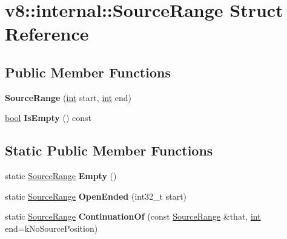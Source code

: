 \hypertarget{structv8_1_1internal_1_1SourceRange}{}\section{v8\+:\+:internal\+:\+:Source\+Range Struct Reference}
\label{structv8_1_1internal_1_1SourceRange}
\subsection*{Public Member Functions}
\begin{DoxyCompactItemize}
\item 
\mbox{\label{structv8_1_1internal_1_1SourceRange_ac4973c89147d09dda9dc633476d47c28}} 
{\bfseries Source\+Range} (\mbox{\hyperlink{classint}{int}} start, \mbox{\hyperlink{classint}{int}} end)
\item 
\mbox{\label{structv8_1_1internal_1_1SourceRange_a76ff9fd943d1a89b26a94c11bc7c53c8}} 
\mbox{\hyperlink{classbool}{bool}} {\bfseries Is\+Empty} () const
\end{DoxyCompactItemize}
\subsection*{Static Public Member Functions}
\begin{DoxyCompactItemize}
\item 
\mbox{\label{structv8_1_1internal_1_1SourceRange_a891931b7ce8fdc343f24310144dc460d}} 
static \mbox{\hyperlink{structv8_1_1internal_1_1SourceRange}{Source\+Range}} {\bfseries Empty} ()
\item 
\mbox{\label{structv8_1_1internal_1_1SourceRange_a505430dc3d7da06e99b5e7392a3ad5d2}} 
static \mbox{\hyperlink{structv8_1_1internal_1_1SourceRange}{Source\+Range}} {\bfseries Open\+Ended} (int32\+\_\+t start)
\item 
\mbox{\label{structv8_1_1internal_1_1SourceRange_a4c2ef97ba5717c1a1416730f27896a4f}} 
static \mbox{\hyperlink{structv8_1_1internal_1_1SourceRange}{Source\+Range}} {\bfseries Continuation\+Of} (const \mbox{\hyperlink{structv8_1_1internal_1_1SourceRange}{Source\+Range}} \&that, \mbox{\hyperlink{classint}{int}} end=k\+No\+Source\+Position)
\end{DoxyCompactItemize}
